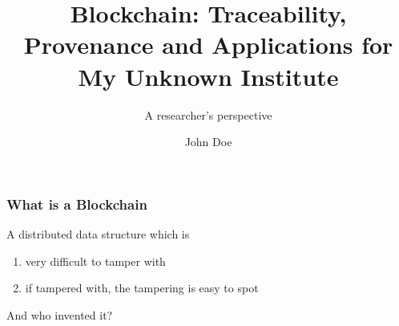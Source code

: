 \documentclass[12pt]{beamer}
\title{Blockchain: Traceability, Provenance and Applications for My  Unknown Institute}
\subtitle{A researcher's perspective}
\author{John Doe}
\institute{Unknown Institute}
\begin{document}
\begin{frame}
    \titlepage
\end{frame}

\begin{frame}  
\frametitle{What is a Blockchain}
A distributed data structure which is
\begin{enumerate}
\item very difficult to tamper with
\item if tampered with, the tampering is easy to spot  
\end{enumerate}
And who invented it?
\end{frame}
\end{document}
